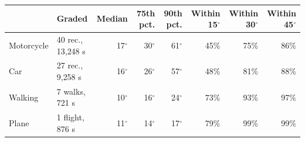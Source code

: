 \begin{tabular}{llrrrrrr}
\toprule
 & Graded & Median & 75th pct. & 90th pct. & Within 15$^\circ$ & Within 30$^\circ$ & Within 45$^\circ$\\
\midrule
Motorcycle & 40 rec., 13{,}248 s & 17$^\circ$ & 30$^\circ$ & 61$^\circ$ & 45\% & 75\% & 86\% \\
Car & 27 rec., 9{,}258 s & 16$^\circ$ & 26$^\circ$ & 57$^\circ$ & 48\% & 81\% & 88\% \\
Walking & 7 walks, 721 s & 10$^\circ$ & 16$^\circ$ & 24$^\circ$ & 73\% & 93\% & 97\% \\
Plane & 1 flight, 876 s & 11$^\circ$ & 14$^\circ$ & 17$^\circ$ & 79\% & 99\% & 99\% \\
\bottomrule
\end{tabular}
